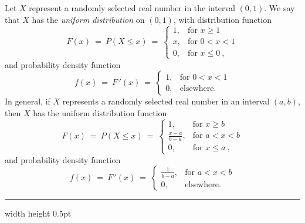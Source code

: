 \begin{exmp}\label{exmp:unifdistrib}
 Let $X$ represent a randomly selected real number in the interval $(0,1)$. We say that $X$ 
 has the \emph{uniform distribution} on $(0,1)$, with distribution function
  \begin{equation}
   F(x) ~=~ P(X \le x)
   ~=~ \begin{cases}
   1, &\text{for $x \ge 1$}\\
   x, &\text{for $0 < x < 1$}\\
   0, &\text{for $x \le 0~$,}
  \end{cases}
 \end{equation}
 and probability density function
 \begin{equation}
   f(x) ~=~ F\,'(x)
   ~=~ \begin{cases}
   1, &\text{for $0 < x < 1$}\\
   0, &\text{elsewhere.}
  \end{cases}
 \end{equation}
 In general, if $X$ represents a randomly selected real number in an interval $(a,b)$, then $X$ has the uniform
 distribution function
 \begin{equation}
   F(x) ~=~ P(X \le x)
   ~=~ \begin{cases}
   1, &\text{for $x \ge b$}\\
   \frac{x-a}{b-a}, &\text{for $a < x < b$}\\
   0, &\text{for $x \le a~$,}
  \end{cases}
 \end{equation}
 and probability density function
 \begin{equation}
   f(x) ~=~ F\,'(x)
   ~=~ \begin{cases}
   \frac{1}{b-a}, &\text{for $a < x < b$}\\
   0, &\text{elsewhere.}
  \end{cases}
 \end{equation}
\end{exmp}
\hrule width \textwidth height 0.5pt
\newpage

